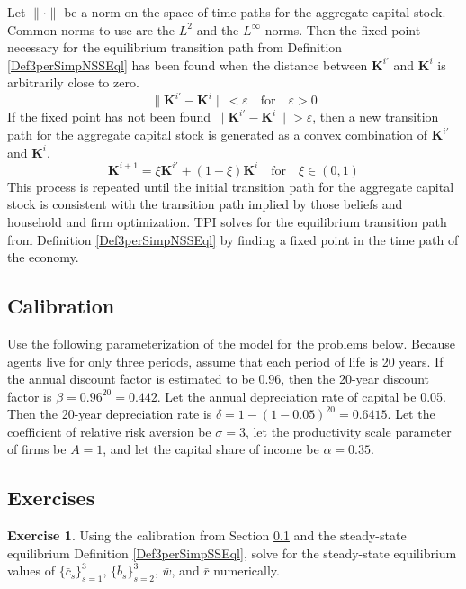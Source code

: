 \documentclass[letterpaper,12pt]{article}
\theoremstyle{definition}
\newtheorem{exercise}{Exercise} %
\numberwithin{equation}{section}
\numberwithin{exercise}{section}
\providecommand{\norm}[1]{\lVert#1\rVert}
\newcommand{\ve}{\varepsilon}
\begin{document}
\begin{spacing}{1.5}
      Let $\norm{\cdot}$ be a norm on the space of time paths for the aggregate capital stock. Common norms to use are the $L^2$ and the $L^\infty$ norms. Then the fixed point necessary for the equilibrium transition path from Definition \ref{Def3perSimpNSSEql} has been found when the distance between $\bm{K}^{i'}$ and $\bm{K}^{i}$ is arbitrarily close to zero.
      \begin{equation}\label{EqEqlTPIdist}
         \norm{\bm{K}^{i'} - \bm{K}^{i}} < \ve \quad\text{for}\quad \ve>0
      \end{equation}
      If the fixed point has not been found $\norm{\bm{K}^{i'} - \bm{K}^{i}} > \ve$, then a new transition path for the aggregate capital stock is generated as a convex combination of $\bm{K}^{i'}$ and $\bm{K}^{i}$.
      \begin{equation}\label{EqEqlTPInewpath}
         \bm{K}^{i+1} = \xi\bm{K}^{i'} + (1-\xi)\bm{K}^{i} \quad\text{for}\quad \xi\in(0,1)
      \end{equation}
      This process is repeated until the initial transition path for the aggregate capital stock is consistent with the transition path implied by those beliefs and household and firm optimization. TPI solves for the equilibrium transition path from Definition \ref{Def3perSimpNSSEql} by finding a fixed point in the time path of the economy.


   \subsection{Calibration}\label{Sec3perSimpCalibr}

      Use the following parameterization of the model for the problems below. Because agents live for only three periods, assume that each period of life is 20 years. If the annual discount factor is estimated to be 0.96, then the 20-year discount factor is $\beta = 0.96^{20} = 0.442$. Let the annual depreciation rate of capital be 0.05. Then the 20-year depreciation rate is $\delta = 1-(1-0.05)^{20} = 0.6415$. Let the coefficient of relative risk aversion be $\sigma = 3$, let the productivity scale parameter of firms be $A=1$, and let the capital share of income be $\alpha = 0.35$.


   \subsection{Exercises}\label{Sec3perSimpEx}

      \begin{exercise} \label{Ex3perSimp_SS}
         Using the calibration from Section \ref{Sec3perSimpCalibr} and the steady-state equilibrium Definition \ref{Def3perSimpSSEql}, solve for the steady-state equilibrium values of $\{\bar{c}_s\}_{s=1}^3$, $\{\bar{b}_s\}_{s=2}^3$, $\bar{w}$, and $\bar{r}$ numerically.
      \end{exercise}


\end{spacing}
\end{document}
